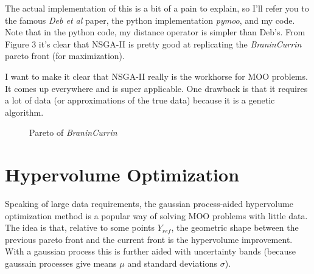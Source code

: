 \documentclass[12pt]{article}
\begin{document}
The actual implementation of this is a bit of a pain to explain, so I'll refer you to the famous \emph{Deb et al} paper, the python implementation \emph{pymoo}, and my code. Note that in the python code, my distance operator is simpler than Deb's. From Figure 3 it's clear that NSGA-II is pretty good at replicating the \emph{BraninCurrin} pareto front (for maximization).

\vspace{5mm}

I want to make it clear that NSGA-II really is the workhorse for MOO problems. It comes up everywhere and is super applicable. One drawback is that it requires a lot of data (or approximations of the true data) because it is a genetic algorithm.

\begin{figure}[h]
\centering
{}
\caption{Pareto of \emph{BraninCurrin}}
\end{figure}

\section{Hypervolume Optimization}

Speaking of large data requirements, the gaussian process-aided hypervolume optimization method is a popular way of solving MOO problems with little data. The idea is that, relative to some points $Y_{ref}$, the geometric shape between the previous pareto front and the current front is the hypervolume improvement. With a gaussian process this is further aided with uncertainty bands (because gaussain processes give means $\mu$ and standard deviations $\sigma$). 
\end{document}
